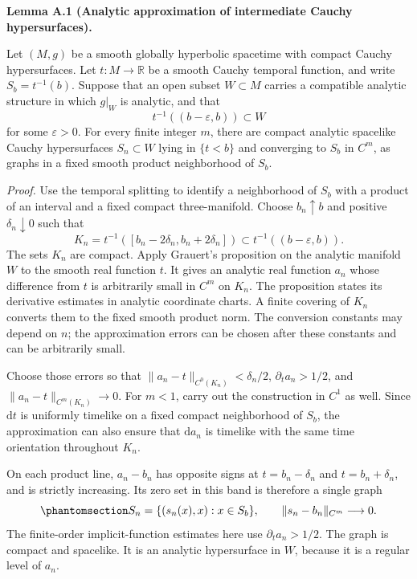 \documentclass[
  english,
  11pt,
  reqno]{amsart}
\makeatletter
\newcommand{\pandocstatementheading}[1]{%
  \par\if@nobreak\else
    \addpenalty{\@beginparpenalty}%
    \addvspace{.5\baselineskip plus .2\baselineskip minus .2\baselineskip}%
  \fi
  {\normalfont\bfseries #1\par}%
  \nobreak\@afterindenttrue\@afterheading
}
\makeatother
\begin{document}
\pandocstatementheading{\protect{}\label{lem:analytic-cauchy-slice-approximation}Lemma A.1 (Analytic approximation of intermediate Cauchy hypersurfaces).}

Let \((M,g)\) be a smooth globally hyperbolic spacetime with compact
Cauchy hypersurfaces. Let \(t:M\to\mathbb R\) be a smooth Cauchy
temporal function, and write \(S_b=t^{-1}(b)\). Suppose that an open
subset \(W\subset M\) carries a compatible analytic structure in which
\(g|_W\) is analytic, and that \[
t^{-1}((b-\varepsilon,b))\subset W
\] for some \(\varepsilon>0\). For every finite integer \(m\), there are
compact analytic spacelike Cauchy hypersurfaces \(S_n\subset W\) lying
in \(\{t<b\}\) and converging to \(S_b\) in \(C^m\), as graphs in a
fixed smooth product neighborhood of \(S_b\).

\emph{Proof.} Use the temporal splitting to identify a neighborhood of
\(S_b\) with a product of an interval and a fixed compact
three-manifold. Choose \(b_n\uparrow b\) and positive
\(\delta_n\downarrow0\) such that \[
K_n=t^{-1}([b_n-2\delta_n,b_n+2\delta_n])
\subset t^{-1}((b-\varepsilon,b)).
\] The sets \(K_n\) are compact. Apply Grauert's proposition on the
analytic manifold \(W\) to the smooth real function \(t\). It gives an
analytic real function \(a_n\) whose difference from \(t\) is
arbitrarily small in \(C^m\) on \(K_n\). The proposition states its
derivative estimates in analytic coordinate charts. A finite covering of
\(K_n\) converts them to the fixed smooth product norm. The conversion
constants may depend on \(n\); the approximation errors can be chosen
after these constants and can be arbitrarily small.

Choose those errors so that \(\|a_n-t\|_{C^0(K_n)}<\delta_n/2\),
\(\partial_ta_n>1/2\), and \(\|a_n-t\|_{C^m(K_n)}\to0\). For \(m<1\),
carry out the construction in \(C^1\) as well. Since \(\mathrm dt\) is
uniformly timelike on a fixed compact neighborhood of \(S_b\), the
approximation can also ensure that \(\mathrm da_n\) is timelike with the
same time orientation throughout \(K_n\).

On each product line, \(a_n-b_n\) has opposite signs at
\(t=b_n-\delta_n\) and \(t=b_n+\delta_n\), and is strictly increasing.
Its zero set in this band is therefore a single graph
\begin{equation}\protect\phantomsection\label{eq:analytic-cauchy-slice-graphs}{
S_n=\{(s_n(x),x):x\in S_b\},
\qquad
\|s_n-b_n\|_{C^m}\longrightarrow0.
}\end{equation} The finite-order implicit-function estimates here use
\(\partial_ta_n>1/2\). The graph is compact and spacelike. It is an
analytic hypersurface in \(W\), because it is a regular level of
\(a_n\).
\end{document}
